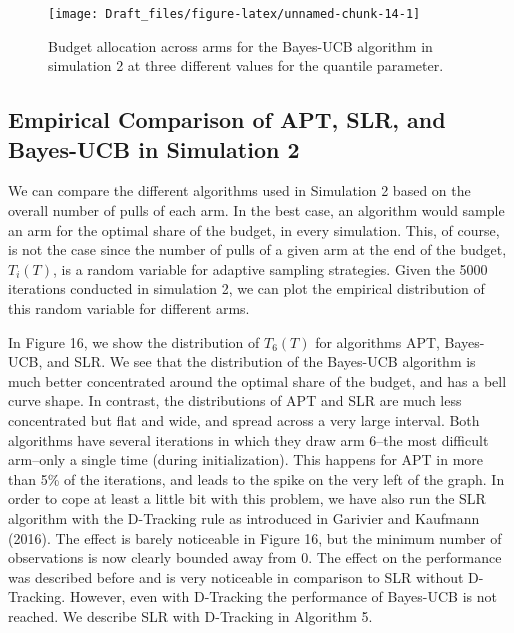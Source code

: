 \documentclass[11pt,]{article}
\begin{document}
\begin{figure}

{\centering \texttt{[image: Draft\_files/figure-latex/unnamed-chunk-14-1]} 

}

\caption{Budget allocation across arms for the Bayes-UCB algorithm in simulation 2 at three different values for the quantile parameter.}\label{fig:unnamed-chunk-14}
\end{figure}

\subsection{Empirical Comparison of APT, SLR, and Bayes-UCB in
Simulation
2}\label{empirical-comparison-of-apt-slr-and-bayes-ucb-in-simulation-2}

We can compare the different algorithms used in Simulation 2 based on
the overall number of pulls of each arm. In the best case, an algorithm
would sample an arm for the optimal share of the budget, in every
simulation. This, of course, is not the case since the number of pulls
of a given arm at the end of the budget, \(T_i(T)\), is a random
variable for adaptive sampling strategies. Given the 5000 iterations
conducted in simulation 2, we can plot the empirical distribution of
this random variable for different arms.

In Figure 16, we show the distribution of \(T_6(T)\) for algorithms APT,
Bayes-UCB, and SLR. We see that the distribution of the Bayes-UCB
algorithm is much better concentrated around the optimal share of the
budget, and has a bell curve shape. In contrast, the distributions of
APT and SLR are much less concentrated but flat and wide, and spread
across a very large interval. Both algorithms have several iterations in
which they draw arm 6--the most difficult arm--only a single time
(during initialization). This happens for APT in more than 5\% of the
iterations, and leads to the spike on the very left of the graph. In
order to cope at least a little bit with this problem, we have also run
the SLR algorithm with the D-Tracking rule as introduced in Garivier and
Kaufmann (2016). The effect is barely noticeable in Figure 16, but the
minimum number of observations is now clearly bounded away from 0. The
effect on the performance was described before and is very noticeable in
comparison to SLR without D-Tracking. However, even with D-Tracking the
performance of Bayes-UCB is not reached. We describe SLR with D-Tracking
in Algorithm 5.
\end{document}
